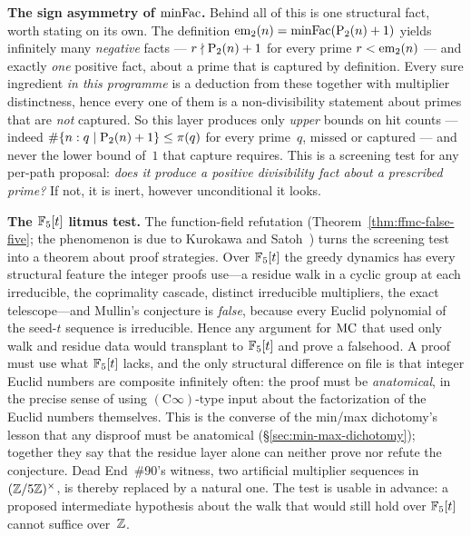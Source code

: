 \smallskip\noindent\textbf{The sign asymmetry of $\mathrm{minFac}$.}\enspace
Behind all of this is one structural fact, worth stating on its own.  The
definition $\mathrm{em}_{2}(n) = \mathrm{minFac}(\mathrm{P}_{2}(n)+1)$ yields infinitely many
\emph{negative} facts --- $r \nmid \mathrm{P}_{2}(n)+1$ for every prime
$r < \mathrm{em}_{2}(n)$ --- and exactly \emph{one} positive fact, about a prime
that is captured by definition.  Every sure ingredient \emph{in this programme} is
a deduction from these together with multiplier distinctness, hence every
one of them is a non-divisibility statement about primes that are
\emph{not} captured.  So this layer produces only \emph{upper} bounds on
hit counts --- indeed $\#\{n : q \mid \mathrm{P}_{2}(n)+1\} \leq \pi(q)$ for every
prime~$q$, missed or captured --- and never the lower bound of~$1$ that
capture requires.  This is a screening test for any per-path proposal:
\emph{does it produce a positive divisibility fact about a prescribed
prime?}  If not, it is inert, however unconditional it looks.

\smallskip\noindent\textbf{The $\mathbb{F}_5[t]$ litmus test.}\enspace
The function-field refutation (Theorem~\ref{thm:ffmc-false-five}; the
phenomenon is due to Kurokawa and Satoh~\cite{KuSa2008}) turns
the screening test into a theorem about proof strategies.  Over
$\mathbb{F}_5[t]$ the greedy dynamics has every structural feature the integer
proofs use---a residue walk in a cyclic group at each irreducible, the
coprimality cascade, distinct irreducible multipliers, the exact
telescope---and Mullin's conjecture is \emph{false}, because every
Euclid polynomial of the seed-$t$ sequence is irreducible.  Hence any
argument for $\mathrm{MC}$ that used only walk and residue data would transplant
to $\mathbb{F}_5[t]$ and prove a falsehood.  A proof must use what $\mathbb{F}_5[t]$
lacks, and the only structural difference on file is that integer Euclid
numbers are composite infinitely often: the proof must be
\emph{anatomical}, in the precise sense of using $(\mathrm{C}\infty)$-type
input about the factorization of the Euclid numbers themselves.  This is
the converse of the min/max dichotomy's lesson that any disproof must be
anatomical (\S\ref{sec:min-max-dichotomy}); together they say that the residue
layer alone can neither prove nor refute the conjecture.  Dead
End~\#90's witness, two artificial multiplier sequences in
$(\mathbb{Z}/5\mathbb{Z})^\times$, is thereby replaced by a natural one.  The test is
usable in advance: a proposed intermediate hypothesis about the walk that
would still hold over $\mathbb{F}_5[t]$ cannot suffice over~$\mathbb{Z}$.

